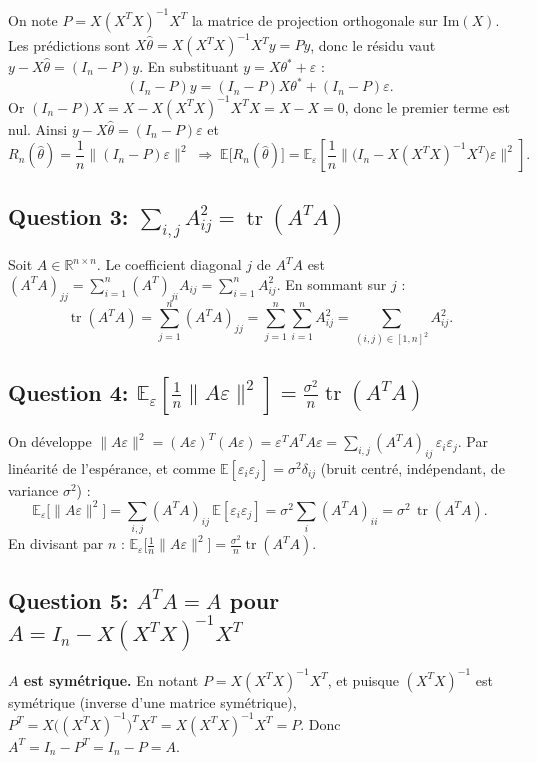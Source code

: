 \documentclass[11pt,a4paper]{article}
\newcommand{\R}{\mathbb{R}}
\newcommand{\E}{\mathbb{E}}
\DeclareMathOperator{\Tr}{tr}
\theoremstyle{plain}
\begin{document}
On note $P=X(X^TX)^{-1}X^T$ la matrice de projection orthogonale sur $\mathrm{Im}(X)$.
Les prédictions sont $X\hat\theta=X(X^TX)^{-1}X^Ty=Py$, donc le résidu vaut
$y-X\hat\theta=(I_n-P)y$. En substituant $y=X\theta^{*}+\varepsilon$ :
\[
    (I_n-P)y=(I_n-P)X\theta^{*}+(I_n-P)\varepsilon .
\]
Or $(I_n-P)X=X-X(X^TX)^{-1}X^TX=X-X=0$, donc le premier terme est nul. Ainsi
$y-X\hat\theta=(I_n-P)\varepsilon$ et
\[
    R_n(\hat\theta)=\frac1n\lVert(I_n-P)\varepsilon\rVert^2
    \;\Longrightarrow\;
    \E\big[R_n(\hat\theta)\big]
       =\E_\varepsilon\!\left[\frac1n\big\lVert\big(I_n-X(X^TX)^{-1}X^T\big)\varepsilon\big\rVert^2\right].
\]

\subsection*{Question 3: $\sum_{i,j}A_{ij}^2=\Tr(A^TA)$}

Soit $A\in\R^{n\times n}$. Le coefficient diagonal $j$ de $A^TA$ est
$(A^TA)_{jj}=\sum_{i=1}^{n}(A^T)_{ji}A_{ij}=\sum_{i=1}^{n}A_{ij}^2$. En sommant sur $j$ :
\[
    \Tr(A^TA)=\sum_{j=1}^{n}(A^TA)_{jj}=\sum_{j=1}^{n}\sum_{i=1}^{n}A_{ij}^2
            =\sum_{(i,j)\in[1,n]^2}A_{ij}^2 .
\]

\subsection*{Question 4: $\E_\varepsilon[\frac1n\lVert A\varepsilon\rVert^2]=\frac{\sigma^2}{n}\Tr(A^TA)$}

On développe $\lVert A\varepsilon\rVert^2=(A\varepsilon)^T(A\varepsilon)=\varepsilon^TA^TA\varepsilon
=\sum_{i,j}(A^TA)_{ij}\,\varepsilon_i\varepsilon_j$. Par linéarité de l'espérance,
et comme $\E[\varepsilon_i\varepsilon_j]=\sigma^2\delta_{ij}$ (bruit centré,
indépendant, de variance $\sigma^2$) :
\[
    \E_\varepsilon\big[\lVert A\varepsilon\rVert^2\big]
      =\sum_{i,j}(A^TA)_{ij}\,\E[\varepsilon_i\varepsilon_j]
      =\sigma^2\sum_{i}(A^TA)_{ii}
      =\sigma^2\,\Tr(A^TA).
\]
En divisant par $n$ : $\E_\varepsilon\big[\frac1n\lVert A\varepsilon\rVert^2\big]=\frac{\sigma^2}{n}\Tr(A^TA)$.

\subsection*{Question 5: $A^TA=A$ pour $A=I_n-X(X^TX)^{-1}X^T$}

\textbf{$A$ est symétrique.} En notant $P=X(X^TX)^{-1}X^T$, et puisque
$(X^TX)^{-1}$ est symétrique (inverse d'une matrice symétrique),
$P^T=X\big((X^TX)^{-1}\big)^TX^T=X(X^TX)^{-1}X^T=P$. Donc $A^T=I_n-P^T=I_n-P=A$.
\end{document}
